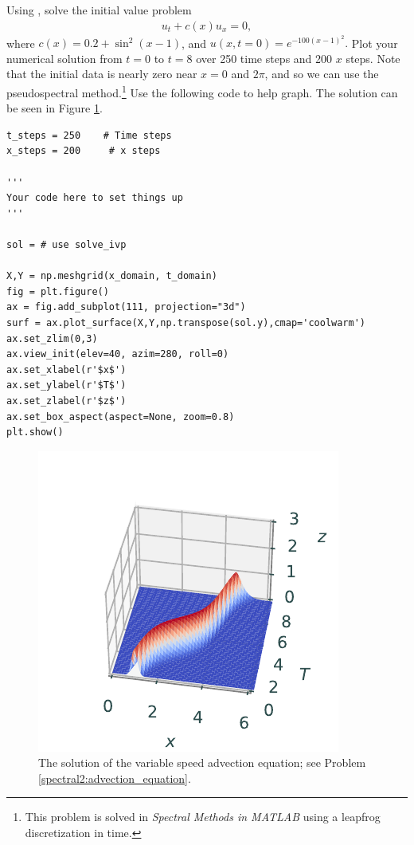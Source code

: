 \begin{problem}
Using , solve the initial value problem 
\begin{align}
	u_t +c(x) u_x = 0,
\end{align}
where $c(x) = 0.2 + \sin^2(x-1)$, and $u(x,t=0) = e^{-100(x-1)^2}.$ 
Plot your numerical solution from $t = 0$ to $t = 8$ over 250 time steps and 200 $x$ steps. 
Note that the initial data is nearly zero near $x = 0$ and $2 \pi$, and so we can use the pseudospectral method.\footnote{This problem is solved in \textit{Spectral Methods in MATLAB} using a leapfrog discretization in time. } 
\label{spectral2:advection_equation}
Use the following code to help graph. The solution can be seen in Figure \ref{fig:spectral:spectral2_advection}.
\begin{lstlisting}
t_steps = 250    # Time steps
x_steps = 200     # x steps

'''
Your code here to set things up
'''

sol = # use solve_ivp

X,Y = np.meshgrid(x_domain, t_domain)
fig = plt.figure()
ax = fig.add_subplot(111, projection="3d")
surf = ax.plot_surface(X,Y,np.transpose(sol.y),cmap='coolwarm')
ax.set_zlim(0,3)
ax.view_init(elev=40, azim=280, roll=0)
ax.set_xlabel(r'$x$')
ax.set_ylabel(r'$T$')
ax.set_zlabel(r'$z$')
ax.set_box_aspect(aspect=None, zoom=0.8)
plt.show()
\end{lstlisting}
\end{problem}

\begin{figure}[H]
\centering
\includegraphics[width=\textwidth]{figures/variable_speed_advection.pdf}
\caption{The solution of the variable speed advection equation; see Problem \ref{spectral2:advection_equation}.}
\label{fig:spectral:spectral2_advection}
\end{figure}

